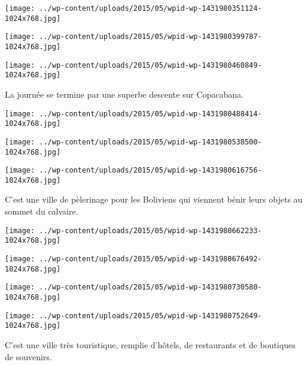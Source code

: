  \newline
\centerline{\texttt{[image: ../wp-content/uploads/2015/05/wpid-wp-1431980351124-1024x768.jpg]} } 
 \newline
 \newline
\centerline{\texttt{[image: ../wp-content/uploads/2015/05/wpid-wp-1431980399787-1024x768.jpg]} } 
 \newline
 \newline
\centerline{\texttt{[image: ../wp-content/uploads/2015/05/wpid-wp-1431980460849-1024x768.jpg]} } 
 \newline
 La journée se termine par une superbe descente sur Copacabana. \newline
 \newline
\centerline{\texttt{[image: ../wp-content/uploads/2015/05/wpid-wp-1431980488414-1024x768.jpg]} } 
 \newline
 \newline
\centerline{\texttt{[image: ../wp-content/uploads/2015/05/wpid-wp-1431980538500-1024x768.jpg]} } 
 \newline
 \newline
\centerline{\texttt{[image: ../wp-content/uploads/2015/05/wpid-wp-1431980616756-1024x768.jpg]} } 
 \newline
 C'est une ville de pèlerinage pour les Boliviens qui viennent bénir leurs objets au sommet du calvaire. \newline
 \newline
\centerline{\texttt{[image: ../wp-content/uploads/2015/05/wpid-wp-1431980662233-1024x768.jpg]} } 
 \newline
 \newline
\centerline{\texttt{[image: ../wp-content/uploads/2015/05/wpid-wp-1431980676492-1024x768.jpg]} } 
 \newline
 \newline
\centerline{\texttt{[image: ../wp-content/uploads/2015/05/wpid-wp-1431980730580-1024x768.jpg]} } 
 \newline
 \newline
\centerline{\texttt{[image: ../wp-content/uploads/2015/05/wpid-wp-1431980752649-1024x768.jpg]} } 
 \newline
 C'est une ville très touristique, remplie d'hôtels, de restaurants et de boutiques de souvenirs. \newline
 \newline
